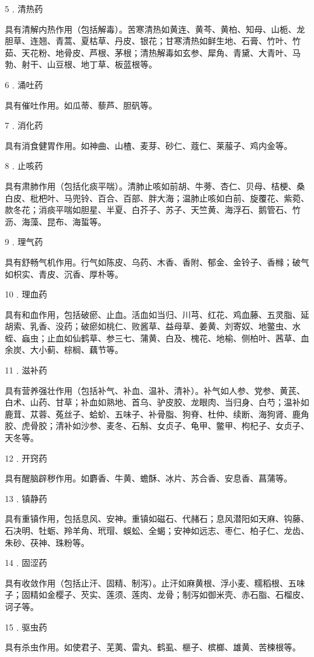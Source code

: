 \documentclass[a4paper,12pt,UTF8,twoside]{ctexbook}
\begin{document}
5﹒清热药

具有清解内热作用（包括解毒）。苦寒清热如黄连、黄芩、黄柏、知母、山栀、龙胆草、连翘、青蒿、夏枯草、丹皮、银花；甘寒清热如鲜生地、石膏、竹叶、竹茹、天花粉、地骨皮、芦根、茅根；清热解毒如玄参、犀角、青黛、大青叶、马勃、射干、山豆根、地丁草、板蓝根等。

6﹒涌吐药

具有催吐作用。如瓜蒂、藜芦、胆矾等。

7﹒消化药

具有消食健胃作用。如神曲、山楂、麦芽、砂仁、蔻仁、莱菔子、鸡内金等。

8﹒止咳药

具有肃肺作用（包括化痰平喘）。清肺止咳如前胡、牛蒡、杏仁、贝母、桔梗、桑白皮、枇杷叶、马兜铃、百合、百部、胖大海；温肺止咳如白前、旋覆花、紫菀、款冬花；消痰平喘如胆星、半夏、白芥子、苏子、天竺黄、海浮石、鹅管石、竹沥、海藻、昆布、海蜇等。

9﹒理气药

具有舒畅气机作用。行气如陈皮、乌药、木香、香附、郁金、金铃子、香橼；破气如枳实、青皮、沉香、厚朴等。

10﹒理血药

具有和血作用，包括破瘀、止血。活血如当归、川芎、红花、鸡血藤、五灵脂、延胡索、乳香、没药；破瘀如桃仁、败酱草、益母草、姜黄、刘寄奴、地鳖虫、水蛭、蝱虫；止血如仙鹤草、参三七、蒲黄、白及、槐花、地榆、侧柏叶、茜草、血余炭、大小蓟、棕榈、藕节等。

11﹒滋补药

具有营养强壮作用（包括补气、补血、温补、清补）。补气如人参、党参、黄芪、白术、山药、甘草；补血如熟地、首乌、驴皮胶、龙眼肉、当归身、白芍；温补如鹿茸、苁蓉、菟丝子、蛤蚧、五味子、补骨脂、狗脊、杜仲、续断、海狗肾、鹿角胶、虎骨胶；清补如沙参、麦冬、石斛、女贞子、龟甲、鳖甲、枸杞子、女贞子、天冬等。

12﹒开窍药

具有醒脑辟秽作用。如麝香、牛黄、蟾酥、冰片、苏合香、安息香、菖蒲等。

13﹒镇静药

具有重镇作用，包括息风、安神。重镇如磁石、代赭石；息风潜阳如天麻、钩藤、石决明、牡蛎、羚羊角、玳瑁、蜈蚣、全蝎；安神如远志、枣仁、柏子仁、龙齿、朱砂、茯神、珠粉等。

14﹒固涩药

具有收敛作用（包括止汗、固精、制泻）。止汗如麻黄根、浮小麦、糯稻根、五味子；固精如金樱子、芡实、莲须、莲肉、龙骨；制泻如御米壳、赤石脂、石榴皮、诃子等。

15﹒驱虫药

具有杀虫作用。如使君子、芜荑、雷丸、鹤虱、榧子、槟榔、雄黄、苦楝根等。
\end{document}
